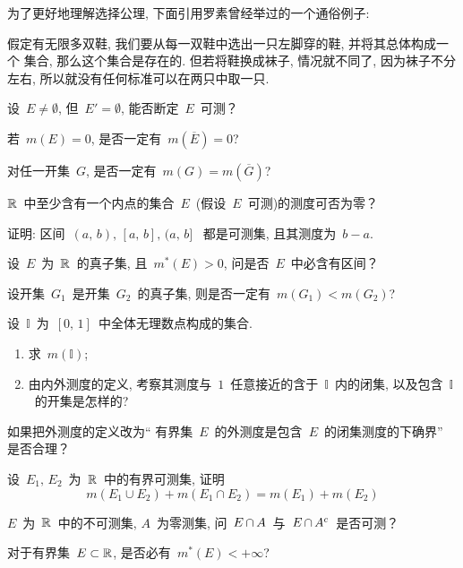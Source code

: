 为了更好地理解选择公理, 下面引用罗素曾经举过的一个通俗例子:


假定有无限多双鞋, 我们要从每一双鞋中选出一只左脚穿的鞋, 并将其总体构成一个
集合, 那么这个集合是存在的. 但若将鞋换成袜子, 情况就不同了, 因为袜子不分左右,
所以就没有任何标准可以在两只中取一只.


\newpage
\begin{problemset}

\item 设~$E \ne \emptyset$, 但~$E'  = \emptyset$, 能否断定~$E$~可测？

\item 若~$m(E)=0$, 是否一定有~$m(\overline{E})=0$?

\item 对任一开集~$G$, 是否一定有~$m(G) = m(\overline{G})$?

\item $\mathbb{R}$~中至少含有一个内点的集合~$E$~(假设~$E$~可测)的测度可否为零？

\item 证明: 区间~$(a,\,b),\,[a,\,b],\, (a,\,b]$~ 都是可测集, 且其测度为~$b-a$.

\item 设~$E$~为~$\mathbb{R}$~的真子集, 且~$m^*(E) > 0$, 问是否~$E$~中必含有区间？

\item 设开集~$G_1$~是开集~$G_2$~的真子集, 则是否一定有~$m(G_1) < m(G_2)$?

\item 设~$\mathbb{I}$~为~$[0,\,1]$~中全体无理数点构成的集合.

\begin{enumerate}
  \item[(1)] 求~$m(\mathbb{I})$;
  \item[(2)] 由内外测度的定义, 考察其测度与~$1$~任意接近的含于~$\mathbb{I}$~内的闭集, 以及包含~$\mathbb{I}$~的开集是怎样的?
\end{enumerate}

\item 如果把外测度的定义改为`` 有界集~$E$~的外测度是包含~$E$~的闭集测度的下确界''
是否合理？

\item 设~$E_1,\,E_2$~为~$\mathbb{R}$~中的有界可测集, 证明
\[
m(E_1 \cup E_2) + m(E_1 \cap E_2) = m(E_1) + m(E_2)
\]

\item $E$~为~$\mathbb{R}$~中的不可测集, $A$~为零测集, 问~$E \mathop{\cap} A$~与~$E \mathop{\cap} A^c$~是否可测？

\item 对于有界集~$E \subset \mathbb{R}$, 是否必有~$m^*(E) < +\infty$?


\end{problemset}
